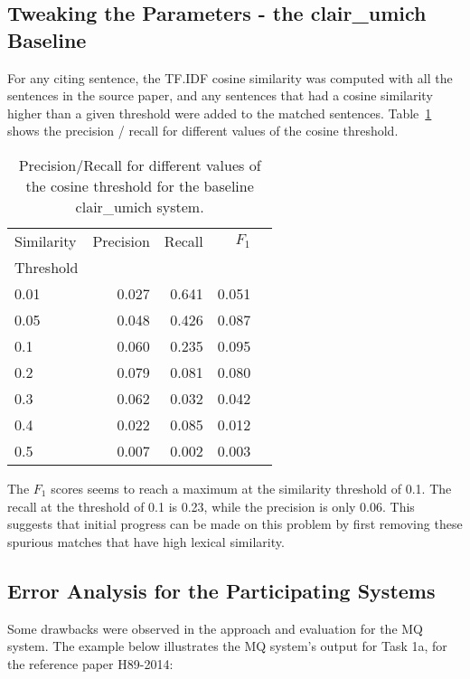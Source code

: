 \documentclass[11pt]{article}
\begin{document}
\subsection{Tweaking the Parameters - the clair\_umich Baseline}
For any citing sentence, the TF.IDF cosine similarity was computed with all the sentences in the source paper, and any sentences that had a cosine similarity higher than a given threshold were added to the matched sentences. Table~\ref{tab:clairumichbaseline} shows the precision / recall for different values of the cosine threshold.
\begin{table}[h]
  \centering
  \begin{tabular}{|l|r|r|r|r|}
  	\hline
	Similarity & Precision & Recall & $F_1$ \\
	Threshold & & & \\
	\hline
	0.01 & 0.027 & 0.641 & 0.051\\
	0.05 & 0.048 & 0.426 & 0.087\\
	0.1 & 0.060 & 0.235 & 0.095\\
	0.2 & 0.079 & 0.081 & 0.080\\
	0.3 & 0.062 & 0.032 & 0.042\\
	0.4 & 0.022 & 0.085 & 0.012\\
	0.5 & 0.007 &  0.002 & 0.003\\
	\hline
  \end{tabular}
  \caption{Precision/Recall for different values of the cosine threshold 
  			for the baseline clair\_umich system.}
  \label{tab:clairumichbaseline}
\end{table}

The $F_1$ scores seems to reach a maximum at the similarity threshold of 0.1. The recall at the threshold of 0.1 is 0.23, while the precision is only 0.06. This suggests that initial progress can be made on this problem by first removing these spurious matches that have high lexical similarity.
\subsection{Error Analysis for the Participating Systems}

Some drawbacks were observed in the approach and evaluation for the MQ system. The example below illustrates the MQ system's output for Task 1a, for the reference paper H89-2014:
\end{document}
